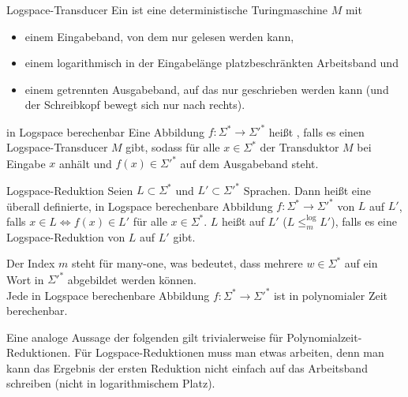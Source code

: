 \begin{Def}{Logspace-Transducer}
    Ein 
    ist eine deterministische Turingmaschine $M$ mit
    \begin{itemize}
        \item
        einem Eingabeband, von dem nur gelesen werden kann,

        \item
        einem logarithmisch in der Eingabelänge platzbeschränkten Arbeitsband und

        \item
        einem getrennten Ausgabeband, auf das nur geschrieben werden kann
        (und der Schreibkopf bewegt sich nur nach rechts).
    \end{itemize}
\end{Def}

\begin{Def}{in Logspace berechenbar}
    Eine Abbildung $f\colon \Sigma^\ast \rightarrow \Sigma'^\ast$ heißt
    , falls es einen Logspace-Transducer $M$ gibt,
    sodass für alle $x \in \Sigma^\ast$
    der Transduktor $M$ bei Eingabe $x$ anhält und $f(x) \in \Sigma'^\ast$ auf dem Ausgabeband
    steht.
\end{Def}

\begin{Def}{Logspace-Reduktion}
    Seien $L \subset \Sigma^\ast$ und $L' \subset \Sigma'^\ast$ Sprachen.
    Dann heißt eine überall definierte, in Logspace berechenbare Abbildung
    $f\colon \Sigma^\ast \rightarrow \Sigma'^\ast$
     von $L$ auf $L'$, falls
    $x \in L \iff f(x) \in L'$ für alle $x \in \Sigma^\ast$.
    $L$ heißt auf $L'$ 
    ($L \le_m^{\log} L'$), falls es eine Logspace-Reduktion von $L$ auf $L'$ gibt.
\end{Def}

\begin{Bem}
    Der Index $m$ steht für many-one, was bedeutet, dass mehrere $w \in \Sigma^\ast$
    auf ein Wort in $\Sigma'^\ast$ abgebildet werden können.\\
    Jede in Logspace berechenbare Abbildung $f\colon \Sigma^\ast \rightarrow \Sigma'^\ast$ ist
    in polynomialer Zeit berechenbar.
\end{Bem}

\linie

\begin{Bem}
    Eine analoge Aussage der folgenden gilt trivialerweise für Polynomialzeit-Reduk\-tionen.
    Für Logspace-Reduktionen muss man etwas arbeiten,
    denn man kann das Ergebnis der ersten Reduktion nicht einfach auf das Arbeitsband schreiben
    (nicht in logarithmischem Platz).
\end{Bem}

